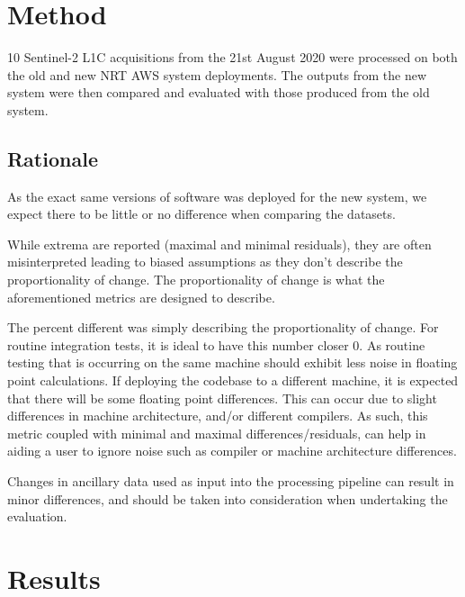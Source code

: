 \documentclass[a4paper]{article}
\begin{document}
    \section{Method}

      \begin{flushleft}
        10 Sentinel-2 L1C acquisitions from the 21st August 2020 were processed on both the old and new NRT AWS system deployments. The outputs from the new system were then compared and evaluated with those produced from the old system.
      \end{flushleft}

    \subsection{Rationale}

      \begin{flushleft}
        As the exact same versions of software was deployed for the new system, we expect there to be little or no difference when comparing the datasets. \par
        While extrema are reported (maximal and minimal residuals), they are often misinterpreted leading to biased assumptions as they don't describe the proportionality of change. The proportionality of change is what the aforementioned metrics are designed to describe. \par
        The percent different was simply describing the proportionality of change. For routine integration tests, it is ideal to have this number closer 0. As routine testing that is occurring on the same machine should exhibit less noise in floating point calculations. If deploying the codebase to a different machine, it is expected that there will be some floating point differences. This can occur due to slight differences in machine architecture, and/or different compilers. As such, this metric coupled with minimal and maximal differences/residuals, can help in aiding a user to ignore noise such as compiler or machine architecture differences. \par
        Changes in ancillary data used as input into the processing pipeline can result in minor differences, and should be taken into consideration when undertaking the evaluation.
      \end{flushleft}

  \newpage

  \section{Results}
\end{document}
